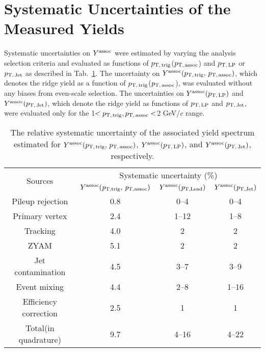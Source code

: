 

\section{Systematic Uncertainties of the Measured Yields}
\label{sec:uncertainties}

Systematic uncertainties on $Y^{\rm{assoc}}$ were estimated by varying the analysis selection criteria and evaluated as functions of $p_\mathrm{T,\,trig}$($p_\mathrm{T,\,assoc}$) and $p_\mathrm{T,\,LP}$ or $p_\mathrm{T,\,Jet}$ as described in Tab.~\ref{tab:syst}. The uncertainty on $Y^{\rm{assoc}}(p_\mathrm{T,\,trig},\,p_\mathrm{T,\,assoc})$, which denotes the ridge yield as a function of $p_\mathrm{T,\,trig}$($p_\mathrm{T,\,assoc}$), was evaluated without any biases from even-scale selection. The uncertainties on $Y^{\rm{assoc}}(p_\mathrm{T,\,LP})$ and $Y^{\rm{assoc}}(p_\mathrm{T,\,Jet})$, which denote the ridge yield as functions of $p_\mathrm{T,\,LP}$ and $p_\mathrm{T,\,Jet}$, were evaluated only for the 1$<p_\mathrm{T,\,trig}, p_\mathrm{T,\,assoc}<$2 GeV/$c$ range.

\begin{table}[h!]
\caption{The relative systematic uncertainty of the associated yield spectrum estimated for $Y^{\rm{assoc}}(p_\mathrm{T,\,trig},\,p_\mathrm{T,\,assoc})$, $Y^{\rm{assoc}}(p_\mathrm{T,\,LP})$, and $Y^{\rm{assoc}}(p_\mathrm{T,\,Jet})$, respectively.}
\centering
\begin{tabular}{|c|c|c|c|}
\hline 
\multirow{2}{*}{Sources}  & \multicolumn{3}{c|}{Systematic uncertainty (\%)} \\\cline{2-4}
         & $Y^{\rm{assoc}}(\it{p}_{\rm{T, trig}},\,\it{p}_{\rm{T, assoc}})$ & $Y^{\rm{assoc}}(\it{p}_{\rm{T, Lead}})$ & $Y^{\rm{assoc}}(\it{p}_{\rm{T, Jet}})$ \\ \hline \hline
Pileup rejection		& 0.8	&0--4		&0--4		\\ \hline
Primary vertex		& 2.4	&1--12	&1--8		\\ \hline

Tracking			& 4.0 	&2		&2		\\ \hline

ZYAM			& 5.1	&2		&2		\\ \hline
Jet contamination	& 4.5	&3--7		&3--9		\\ \hline

Event mixing			& 4.4	&2--8		&1--16	\\ \hline

Efficiency correction	& 2.5 	&1		&1		\\ \hline \hline
Total(in quadrature)			& 9.7	&4--16	&4--22	\\ 
\hline 
\end{tabular}
\label{tab:syst}
\end{table}

